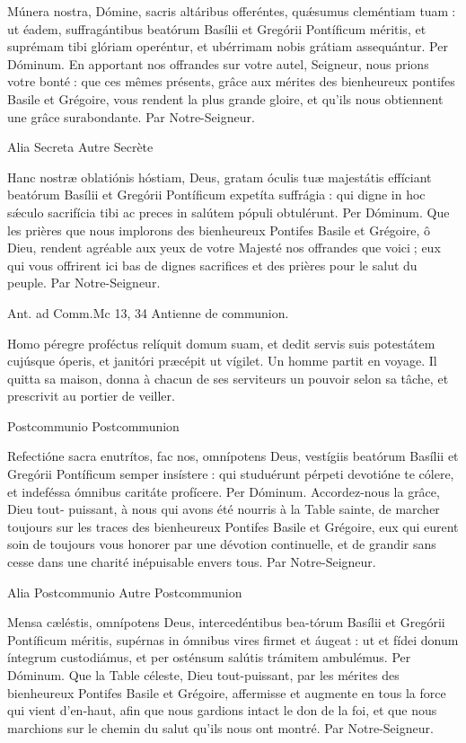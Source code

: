 \begin{paracol}{2}
Múnera nostra, Dómine, sacris altáribus offeréntes, quǽsumus cleméntiam tuam : ut éadem, suffragántibus beatórum Basílii et Gregórii Pontíficum méritis, et suprémam tibi glóriam operéntur, et ubérrimam nobis grátiam assequántur. Per Dóminum.
\switchcolumn
En apportant nos offrandes sur votre autel, Seigneur, nous prions votre bonté : que ces mêmes présents, grâce aux mérites des bienheureux pontifes Basile et Grégoire, vous rendent la plus grande gloire, et qu’ils nous obtiennent une grâce surabondante. Par Notre-Seigneur.
\switchcolumn*

Alia Secreta
\switchcolumn
Autre Secrète
\switchcolumn*

Hanc nostræ oblatiónis hóstiam,  Deus, gratam óculis tuæ majestátis effíciant beatórum Basílii et Gregórii Pontíficum expetíta suffrágia : qui digne in hoc sǽculo sacrifícia tibi ac preces in salútem pópuli obtulérunt. Per Dóminum.
\switchcolumn
Que les prières que nous implorons  des bienheureux Pontifes Basile et Grégoire, ô Dieu, rendent agréable aux yeux de votre Majesté nos offrandes que voici ; eux qui vous offrirent ici bas de dignes sacrifices et des prières pour le salut du peuple. Par Notre-Seigneur.
\switchcolumn*

Ant. ad Comm.\hfill Mc 13, 34
\switchcolumn
Antienne de communion.
\switchcolumn*

Homo péregre proféctus relíquit domum suam, et dedit servis suis potestátem cujúsque óperis, et janitóri præcépit ut vígilet.
\switchcolumn
Un homme partit en voyage. Il quitta sa maison, donna à chacun de ses serviteurs un pouvoir selon sa tâche, et prescrivit au portier de veiller.
\switchcolumn*

Postcommunio
\switchcolumn
Postcommunion
\switchcolumn*

Refectióne sacra enutrítos, fac  nos, omnípotens Deus, vestígiis beatórum Basílii et Gregórii Pontíficum semper insístere : qui studuérunt pérpeti devotióne te cólere, et indeféssa ómnibus caritáte profícere. Per Dóminum.
\switchcolumn
Accordez-nous la grâce, Dieu tout- puissant, à nous qui avons été nourris à la Table sainte, de marcher toujours sur les traces des bienheureux Pontifes Basile et Grégoire, eux qui eurent soin de toujours vous  honorer par une dévotion continuelle, et de grandir sans cesse dans une charité inépuisable envers tous. Par Notre-Seigneur.
\switchcolumn*

Alia Postcommunio
\switchcolumn
Autre Postcommunion
\switchcolumn*

Mensa cæléstis, omnípotens  Deus, intercedéntibus bea-tórum Basílii et Gregórii Pontíficum méritis, supérnas in ómnibus vires firmet et áugeat : ut et fídei donum íntegrum custodiámus, et per osténsum salútis trámitem ambulémus. Per Dóminum.
\switchcolumn
Que la Table céleste, Dieu tout-puissant, par les mérites des bienheureux Pontifes Basile et Grégoire, affermisse et augmente en tous la force qui vient d’en-haut, afin que nous gardions intact le don de la foi, et que nous marchions sur le chemin du salut qu’ils nous ont montré. Par Notre-Seigneur.
\switchcolumn*


\end{paracol}
